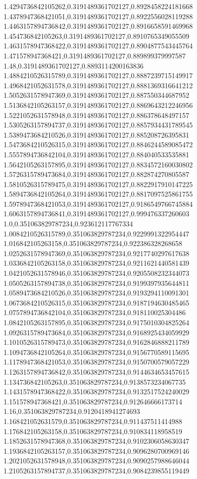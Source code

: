 1.4294736842105262,0.3191489361702127,0.8928458224181668
1.4378947368421051,0.3191489361702127,0.8922556028119288
1.4463157894736842,0.3191489361702127,0.8916658591469968
1.454736842105263,0.3191489361702127,0.8910765349055509
1.4631578947368422,0.3191489361702127,0.8904877543445764
1.471578947368421,0.3191489361702127,0.889899379997587
1.48,0.3191489361702127,0.8893114200163836
1.4884210526315789,0.3191489361702127,0.8887239715149917
1.4968421052631578,0.3191489361702127,0.8881369316641212
1.5052631578947369,0.3191489361702127,0.887550344687952
1.5136842105263157,0.3191489361702127,0.8869643212246956
1.5221052631578948,0.3191489361702127,0.886378648497157
1.5305263157894737,0.3191489361702127,0.8857934431789545
1.5389473684210526,0.3191489361702127,0.885208726395831
1.5473684210526315,0.3191489361702127,0.8846244589085472
1.5557894736842104,0.3191489361702127,0.884040533535881
1.5642105263157895,0.3191489361702127,0.8834572160030802
1.5726315789473684,0.3191489361702127,0.882874270805587
1.5810526315789475,0.3191489361702127,0.8822917910147225
1.5894736842105264,0.3191489361702127,0.8817097525861755
1.5978947368421053,0.3191489361702127,0.9186549766745884
1.6063157894736841,0.3191489361702127,0.999476337260603
1.0,0.351063829787234,0.923612117767334
1.0084210526315789,0.351063829787234,0.9229991322954447
1.016842105263158,0.351063829787234,0.922386328268658
1.0252631578947369,0.351063829787234,0.9217740297617638
1.0336842105263158,0.351063829787234,0.9211621440581439
1.0421052631578946,0.351063829787234,0.9205508232344073
1.0505263157894738,0.351063829787234,0.9199397935644811
1.0589473684210526,0.351063829787234,0.9193294110091301
1.0673684210526315,0.351063829787234,0.9187194630485465
1.0757894736842104,0.351063829787234,0.918110025304486
1.0842105263157895,0.351063829787234,0.9175010304825264
1.0926315789473684,0.351063829787234,0.9168925434059929
1.1010526315789473,0.351063829787234,0.9162846888211789
1.1094736842105264,0.351063829787234,0.9156770589115695
1.1178947368421053,0.351063829787234,0.9150700579057229
1.1263157894736842,0.351063829787234,0.9144634653457615
1.134736842105263,0.351063829787234,0.9138573234067735
1.1431578947368422,0.351063829787234,0.9132517524240029
1.151578947368421,0.351063829787234,0.912646666173714
1.16,0.351063829787234,0.9120418941274693
1.168421052631579,0.351063829787234,0.911437511414988
1.176842105263158,0.351063829787234,0.910834118958519
1.1852631578947368,0.351063829787234,0.9102306058630347
1.1936842105263157,0.351063829787234,0.9096280700969146
1.2021052631578948,0.351063829787234,0.9090257988646044
1.2105263157894737,0.351063829787234,0.9084239855119449
